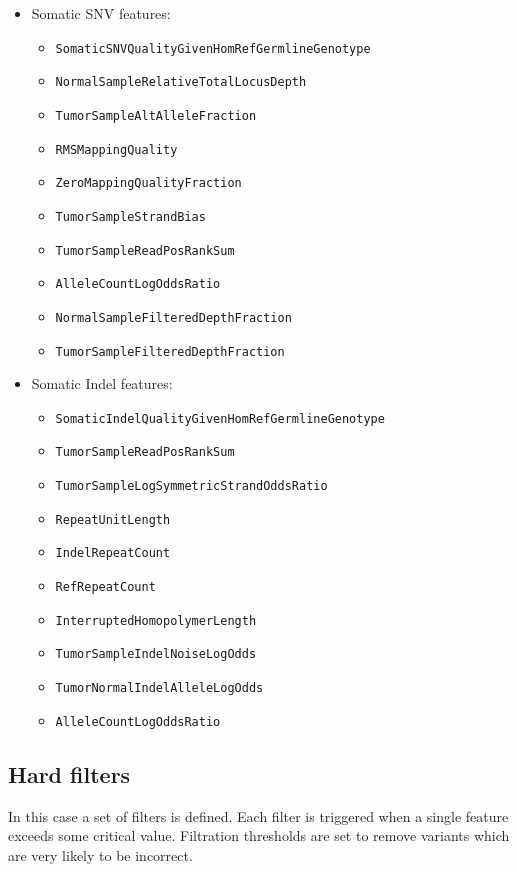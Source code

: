 \documentclass{article}
\begin{document}
\begin{itemize}
    \item Somatic SNV features:
    \begin{itemize}
        \item \texttt{SomaticSNVQualityGivenHomRefGermlineGenotype}
        \item \texttt{NormalSampleRelativeTotalLocusDepth}
        \item \texttt{TumorSampleAltAlleleFraction}
        \item \texttt{RMSMappingQuality}
        \item \texttt{ZeroMappingQualityFraction}
        \item \texttt{TumorSampleStrandBias}
        \item \texttt{TumorSampleReadPosRankSum}
        \item \texttt{AlleleCountLogOddsRatio}
        \item \texttt{NormalSampleFilteredDepthFraction}
        \item \texttt{TumorSampleFilteredDepthFraction}
    \end{itemize}
    \item Somatic Indel features:
    \begin{itemize}
        \item \texttt{SomaticIndelQualityGivenHomRefGermlineGenotype}
        \item \texttt{TumorSampleReadPosRankSum}
        \item \texttt{TumorSampleLogSymmetricStrandOddsRatio}
        \item \texttt{RepeatUnitLength}
        \item \texttt{IndelRepeatCount}
        \item \texttt{RefRepeatCount}
        \item \texttt{InterruptedHomopolymerLength}
        \item \texttt{TumorSampleIndelNoiseLogOdds}
        \item \texttt{TumorNormalIndelAlleleLogOdds}
        \item \texttt{AlleleCountLogOddsRatio}
    \end{itemize}
\end{itemize}

\subsection{Hard filters}

In this case a set of filters is defined. Each filter is triggered when a single feature exceeds some critical value. Filtration thresholds are set to remove variants which are very likely to be incorrect.
\end{document}
